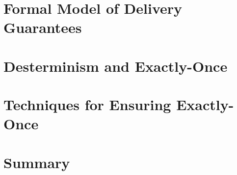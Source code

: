 

\section{Formal Model of Delivery Guarantees}
\label{fs-formalism}


\section{Desterminism and Exactly-Once}
\label{fs-determinism-eo}


\section{Techniques for Ensuring Exactly-Once}
\label{fs-eo-impl}


\section{Summary}
\label{fs-conclusion-seciton}
